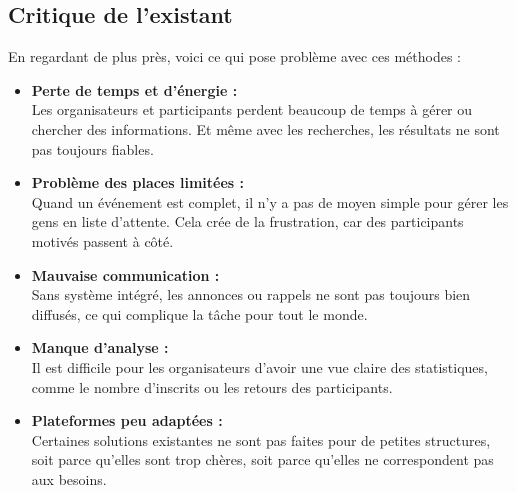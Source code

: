 \subsection{Critique de l’existant}
En regardant de plus près, voici ce qui pose problème avec ces méthodes :
\begin{itemize}[label=$\rightarrow$]
    \item \textbf{Perte de temps et d’énergie :} \\
    Les organisateurs et participants perdent beaucoup de temps à gérer ou chercher des informations. Et même avec les recherches, les résultats ne sont pas toujours fiables.
    \item \textbf{Problème des places limitées :} \\
    Quand un événement est complet, il n’y a pas de moyen simple pour gérer les gens en liste d’attente. Cela crée de la frustration, car des participants motivés passent à côté.
    \item \textbf{Mauvaise communication :} \\
    Sans système intégré, les annonces ou rappels ne sont pas toujours bien diffusés, ce qui complique la tâche pour tout le monde.
    \item \textbf{Manque d’analyse :} \\
    Il est difficile pour les organisateurs d’avoir une vue claire des statistiques, comme le nombre d’inscrits ou les retours des participants.
    \item \textbf{Plateformes peu adaptées :} \\
    Certaines solutions existantes ne sont pas faites pour de petites structures, soit parce qu’elles sont trop chères, soit parce qu’elles ne correspondent pas aux besoins.
\end{itemize}

